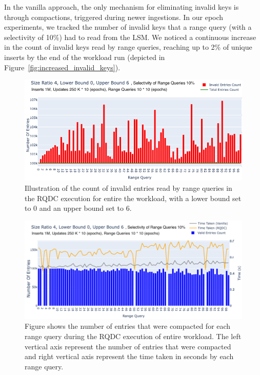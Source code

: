 In the vanilla approach, the only mechanism for eliminating invalid keys is through compactions, triggered during newer 
ingestions. In our epoch experiments, we tracked the number of invalid keys that a range query (with a selectivity of 
10\%) had to read from the LSM. We noticed a continuous increase in the count of invalid keys read by range queries, 
reaching up to 2\% of unique inserts by the end of the workload run (depicted in Figure~\ref{fig:increased_invalid_keys}).

    \begin{figure}%
        \centering
        \includegraphics[scale=0.28]{Figures/epoch-experiment-size-ratio-4-range-queries.png}
        \caption{Illustration of the count of invalid entries read by range queries in the RQDC execution for entire the 
        workload, with a lower bound set to 0 and an upper bound set to 6.}\label{fig:reduced_invalid_keys}
    \end{figure}
    \begin{figure}%
        \centering
        \includegraphics[scale=0.27]{Figures/epoch-experiment-size-ratio-4-rq-time.png}
        \caption{Figure shows the number of entries that were compacted for each range query during the RQDC 
        execution of entire workload. The left vertical axis represent the number of entries that were compacted and right vertical
        axis represent the time taken in seconds by each range query.}\label{fig:increased_range_queries_time}
    \end{figure}

